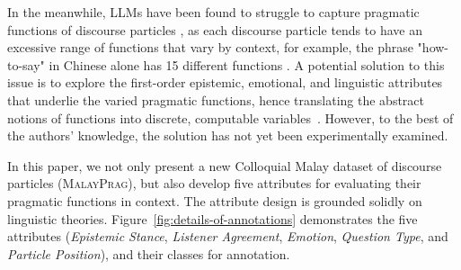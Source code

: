 \documentclass[11pt]{article}
\begin{document}


In the meanwhile, LLMs have been found to struggle to capture pragmatic functions of discourse particles \cite{sheffield2025just}, as each discourse particle tends to have an excessive range of functions that vary by context, for example, the phrase "how-to-say" in Chinese alone has 15 different functions \cite{chen_functions_2023}. 
A potential solution to this issue is to explore the first-order epistemic, emotional, and linguistic attributes that underlie the varied pragmatic functions, hence translating the abstract notions of functions into discrete, computable variables~\citep{hovy2021importance,choi2023llms}. However, to the best of the authors' knowledge, the solution has not yet been experimentally examined. 

In this paper, we not only present a new Colloquial Malay dataset of discourse particles (\textsc{MalayPrag}), but also develop five attributes for evaluating their pragmatic functions in context. The attribute design is grounded solidly on linguistic theories.
Figure~\ref{fig:details-of-annotations} demonstrates the five attributes (\textit{Epistemic Stance}, \textit{Listener Agreement}, \textit{Emotion}, \textit{Question Type}, and \textit{Particle Position}), and their classes for annotation. 
\end{document}
